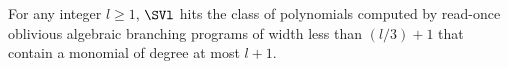 \begin{theorem}\label{thm.roabp}
  For any integer $l \ge 1$, $\SVl$ hits the class of polynomials computed by
  read-once oblivious algebraic branching programs of width less than
  $(l/3)+1$ that contain a monomial of degree at most $l+1$.
\end{theorem}